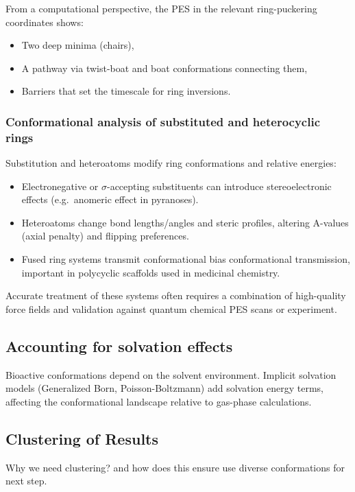\documentclass[12pt]{article}
\begin{document}
From a computational perspective, the PES in the relevant ring-puckering coordinates shows:
\begin{itemize}
  \item Two deep minima (chairs),
  \item A pathway via twist-boat and boat conformations connecting them,
  \item Barriers that set the timescale for ring inversions.
\end{itemize}

\subsubsection{Conformational analysis of substituted and heterocyclic rings}

Substitution and heteroatoms modify ring conformations and relative energies:

\begin{itemize}
  \item Electronegative or $\sigma$-accepting substituents can introduce stereoelectronic effects (e.g.\ anomeric effect in pyranoses).
  \item Heteroatoms change bond lengths/angles and steric profiles, altering A-values (axial penalty) and flipping preferences.
  \item Fused ring systems transmit conformational bias conformational transmission, important in polycyclic scaffolds used in medicinal chemistry.
\end{itemize}
Accurate treatment of these systems often requires a combination of high-quality force fields and validation against quantum chemical PES scans or experiment.

\subsection{Accounting for solvation effects}

Bioactive conformations depend on the solvent environment. Implicit solvation models (Generalized Born, Poisson-Boltzmann) add solvation energy terms, affecting the conformational landscape relative to gas-phase calculations. 

\subsection{Clustering of Results}

Why we need clustering? and how does this ensure use diverse conformations for next step.
\end{document}
